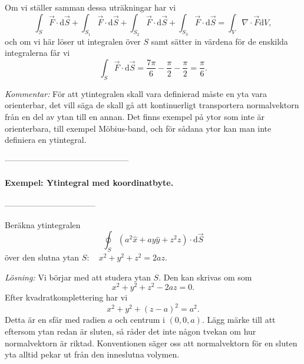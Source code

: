 \documentclass[%
oneside,                 %
final,                   %
10pt]{article}
\begin{document}
Om vi ställer samman dessa uträkningar har vi
\begin{equation}
  \int_S \vec{F} \cdot \mbox{d}\vec{S} + \int_{S_1} \vec{F} \cdot \mbox{d}\vec{S} + 
\int_{S_2} \vec{F} \cdot \mbox{d}\vec{S} + \int_{S_3} \vec{F} \cdot \mbox{d}\vec{S} =
\int_V \nabla \cdot \vec{F} \mbox{d}V,
\end{equation}
och om vi här löser ut integralen över $S$ samt sätter in värdena för de enskilda integralerna får vi
\begin{equation}
  \int_S \vec{F} \cdot \mbox{d}\vec{S} = \frac{7\pi}{6} - \frac{\pi}{2} -
\frac{\pi}{2} = \frac{\pi}{6}.
\end{equation}

\emph{Kommentar:}  
För att ytintegralen skall vara definierad måste en yta vara orienterbar, det vill säga de skall gå att kontinuerligt transportera normalvektorn från en del av ytan till en annan.  Det finns exempel på ytor som inte är orienterbara, till exempel Möbius-band, och för sådana ytor kan man inte definiera en ytintegral.

---------------------------------------------

\paragraph{Exempel: Ytintegral med koordinatbyte.}
---------------------------------

Beräkna ytintegralen
\begin{equation}
  \oint_S \left(a^2\hat{x} +ay\hat{y} + z^2\hat{z}\right) 
\cdot \mbox{d}\vec{S}
\end{equation}
över den slutna ytan $S:\quad x^2 + y^2 + z^2 = 2az$.

\emph{Lösning:}  
Vi börjar med att studera ytan $S$. Den kan skrivas om som
\begin{equation}
  x^2 + y^2 + z^2 - 2az = 0.
\end{equation}
Efter kvadratkomplettering har vi
\begin{equation}
  x^2 + y^2 + \left(z -a\right)^2 = a^2.
\end{equation}
Detta är en sfär med radien $a$ och centrum i $(0,0,a)$.  Lägg märke till att eftersom ytan redan är sluten, så råder det inte någon tvekan om hur normalvektorn är riktad.  Konventionen säger oss att normalvektorn för en sluten yta alltid pekar ut från den inneslutna volymen.
\end{document}
